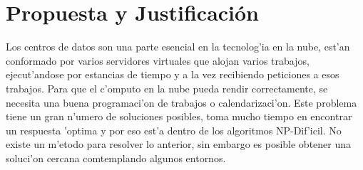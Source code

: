 
\chapter*{Propuesta y Justificaci\'on}


Los centros de datos son una parte esencial en la tecnolog'ia en la nube, est'an conformado por varios servidores virtuales que alojan varios trabajos, ejecut'andose por estancias de tiempo y a la vez recibiendo peticiones a esos trabajos.\cite{shimpy2014different}
Para que el c'omputo en la nube pueda rendir correctamente, se necesita una buena programaci'on de trabajos o calendarizaci'on. Este problema tiene un gran n'umero de soluciones posibles, toma mucho tiempo en encontrar un respuesta 'optima y por eso est'a dentro de los algoritmos NP-Dif'icil. No existe un m'etodo para resolver lo anterior, sin embargo es posible obtener una soluci'on cercana comtemplando algunos entornos.\cite{srinivasan2014cloud} 











